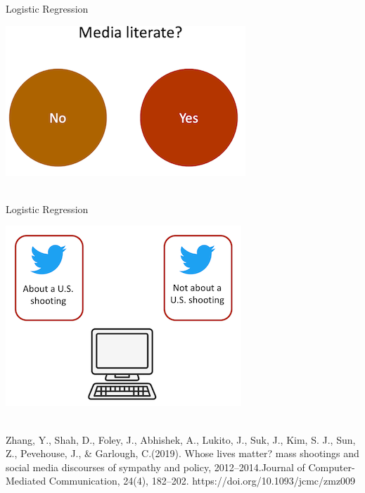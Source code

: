 \documentclass[compress]{beamer}
\begin{document}
\begin{frame}{Logistic Regression}
	
\begin{center}
	\includegraphics{../pictures/medialiteracydummy.png} \\\
\end{center}
\end{frame}


\begin{frame}{Logistic Regression}
	
\begin{center}
	\includegraphics{../pictures/Zhangetal_1.png} \\\
\end{center}
\begin{tiny}
Zhang, Y., Shah, D., Foley, J., Abhishek, A., Lukito, J., Suk, J., Kim, S. J., Sun, Z., Pevehouse, J., \& Garlough, C.(2019). Whose lives matter? mass shootings and social media discourses of sympathy and policy, 2012–2014.Journal of Computer-Mediated Communication, 24(4), 182–202. https://doi.org/10.1093/jcmc/zmz009
\end{tiny}
\end{frame}
\end{document}
